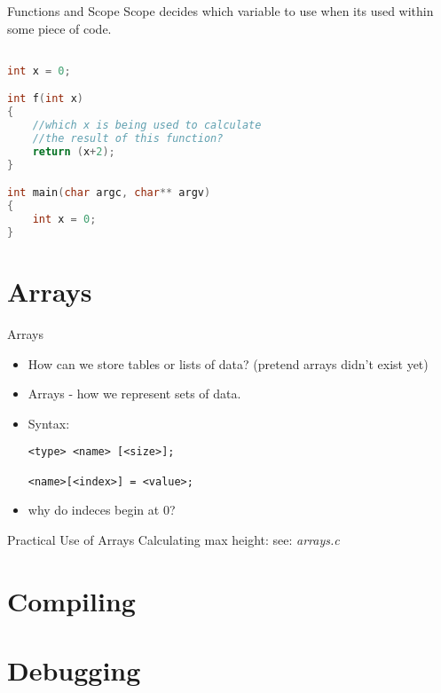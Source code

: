 \documentclass[main.tex]{subfile}
\begin{document}
\begin{frame}[fragile]{Functions and Scope}
Scope decides which variable to use when its used within some piece of code.

	\begin{lstlisting}[language=c]

int x = 0;

int f(int x)
{
	//which x is being used to calculate 
	//the result of this function?
	return (x+2);
}

int main(char argc, char** argv)
{
	int x = 0;
}

	\end{lstlisting}
\end{frame}


\section{Arrays}
\label{sec:arrays}

\begin{frame}[fragile]{Arrays}
	\begin{itemize}
		\item How can we store tables or lists of data? (pretend arrays didn't exist
			yet)
		\item Arrays - how we represent sets of data.
		\item Syntax:
			\begin{lstlisting}
<type> <name> [<size>];

<name>[<index>] = <value>;
			\end{lstlisting}
		\item why do indeces begin at 0?
	\end{itemize}
\end{frame}

\begin{frame}[fragile]{Practical Use of Arrays}
	Calculating max height: see: \textit{arrays.c}
\end{frame}



\section{Compiling} 
\label{sec:compiling}


\section{Debugging} 
\label{sec:debugging}
\end{document}
